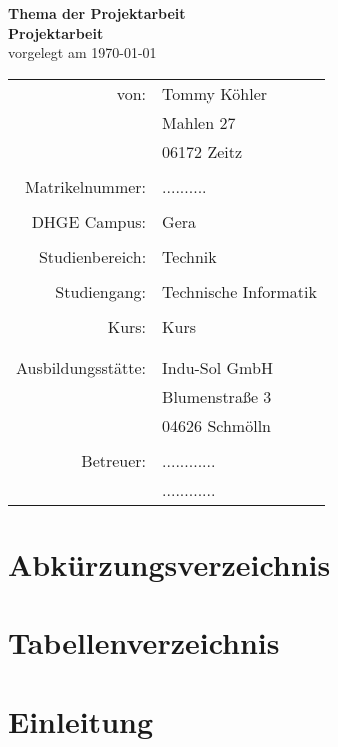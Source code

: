\documentclass[a4paper,12pt]{scrartcl}
\begin{document}
\begin{center}
	{\LARGE \textbf{Thema der Projektarbeit}}\\
	\vspace{2.0cm}				%
	{\Huge \textbf{Projektarbeit}}\\
	\vspace{1.0cm}
	vorgelegt am \today\\
	\vspace{2.0cm}
	
\begin{tabular}{rl}
	von:				& Tommy Köhler\\
						& Mahlen 27\\
						& 06172 Zeitz\\
						& \\
	Matrikelnummer: 	& ..........\\
						& \\
	DHGE Campus:		& Gera\\
						& \\
	Studienbereich:		& Technik\\
						& \\
	Studiengang:		& Technische Informatik\\
						& \\
	Kurs:				& Kurs\\
						& \\
						& \\
	Ausbildungsstätte:	& Indu-Sol GmbH\\
						& Blumenstraße 3\\
						& 04626 Schmölln\\
						& \\
	Betreuer:			& ............ \\
						& ............ \\
						
						
\end{tabular}
\end{center}
\newpage

\tableofcontents

\newpage
\section{Abkürzungsverzeichnis}

\newpage
\section{Tabellenverzeichnis}

\newpage
\section{Einleitung}

\newpage
\end{document}
